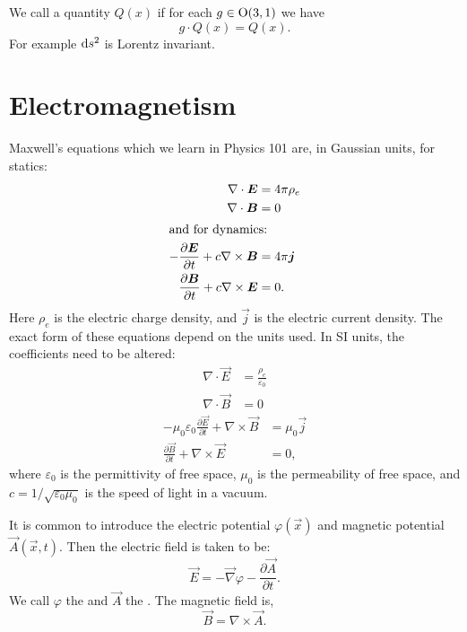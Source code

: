 We call a quantity $Q(x)$  if for each $g\in\O(3,1)$
we have
\begin{equation}
g\cdot Q(x) = Q(x).
\end{equation}
For example $\D s^{2}$ is Lorentz invariant.

\section{Electromagnetism}

Maxwell's equations which we learn in Physics 101 are, in Gaussian
units, for statics:
\begin{subequations}
\begin{align}
\nabla\cdot\vec{E} &= 4\pi\rho_{e}\\
\nabla\cdot\vec{B} &= 0\\
\intertext{and for dynamics:}
-\frac{\partial\vec{E}}{\partial t} + c\nabla\times\vec{B} &= 4\pi\vec{j}\\
\frac{\partial\vec{B}}{\partial t} + c\nabla\times\vec{E} &= 0.
\end{align}
\end{subequations}
Here $\rho_{e}$ is the electric charge density, and $\vec{j}$ is
the electric current density.
The exact form of these equations depend on the units used. In SI units,
the coefficients need to be altered:
\begin{subequations}
\begin{align}
\nabla\cdot\vec{E} &= \frac{\rho_{e}}{\varepsilon_{0}}\\
\nabla\cdot\vec{B} &= 0
\end{align}
\end{subequations}
\begin{subequations}
\begin{align}
-\mu_{0}\varepsilon_{0}\frac{\partial\vec{E}}{\partial t} + \nabla\times\vec{B} &= \mu_{0}\vec{j}\\
\frac{\partial\vec{B}}{\partial t} + \nabla\times\vec{E} &= 0,
\end{align}
\end{subequations}
where $\varepsilon_{0}$ is the permittivity of free space, $\mu_{0}$ is
the permeability of free space, and $c=1/\sqrt{\varepsilon_{0}\mu_{0}}$
is the speed of light in a vacuum.

It is common to introduce the electric potential $\varphi(\vec{x})$
and magnetic potential $\vec{A}(\vec{x}, t)$. Then the electric field is
taken to be:
\begin{equation}
\vec{E} = -\vec{\nabla}\varphi - \frac{\partial\vec{A}}{\partial t}.
\end{equation}
We call $\varphi$ the  and $\vec{A}$ the
.
The magnetic field is,
\begin{equation}
\vec{B} = \nabla\times\vec{A}.
\end{equation}

